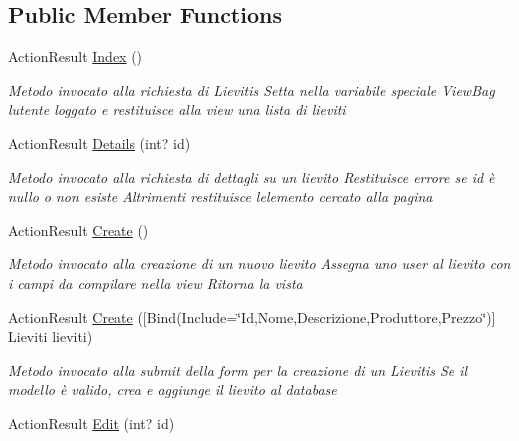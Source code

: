 \subsection*{Public Member Functions}
\begin{DoxyCompactItemize}
\item 
Action\+Result \mbox{\hyperlink{class_brew_day2_1_1_controllers_1_1_lievitis_controller_aee68004d8a6975ea5628dd366158c6b4}{Index}} ()
\begin{DoxyCompactList}\small\item\em Metodo invocato alla richiesta di Lievitis Setta nella variabile speciale View\+Bag l\textquotesingle{}utente loggato e restituisce alla view una lista di lieviti \end{DoxyCompactList}\item 
Action\+Result \mbox{\hyperlink{class_brew_day2_1_1_controllers_1_1_lievitis_controller_ab756f4407e24098c221bf07b9d18dd47}{Details}} (int? id)
\begin{DoxyCompactList}\small\item\em Metodo invocato alla richiesta di dettagli su un lievito Restituisce errore se id è nullo o non esiste Altrimenti restituisce l\textquotesingle{}elemento cercato alla pagina \end{DoxyCompactList}\item 
Action\+Result \mbox{\hyperlink{class_brew_day2_1_1_controllers_1_1_lievitis_controller_a643cdf21a5e9bc59b122638a0ca6b9bf}{Create}} ()
\begin{DoxyCompactList}\small\item\em Metodo invocato alla creazione di un nuovo lievito Assegna uno user al lievito con i campi da compilare nella view Ritorna la vista \end{DoxyCompactList}\item 
Action\+Result \mbox{\hyperlink{class_brew_day2_1_1_controllers_1_1_lievitis_controller_abf9c59637e2f4a7e218c1fec7248b513}{Create}} (\mbox{[}Bind(Include=\char`\"{}Id,Nome,Descrizione,Produttore,Prezzo\char`\"{})\mbox{]} Lieviti lieviti)
\begin{DoxyCompactList}\small\item\em Metodo invocato alla submit della form per la creazione di un Lievitis Se il modello è valido, crea e aggiunge il lievito al database \end{DoxyCompactList}\item 
Action\+Result \mbox{\hyperlink{class_brew_day2_1_1_controllers_1_1_lievitis_controller_a1325a57f77914d9c51fdd500680009d4}{Edit}} (int? id)

\end{DoxyCompactItemize}
